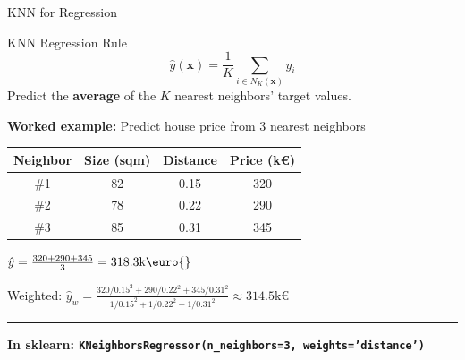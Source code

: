 \documentclass[8pt,aspectratio=169]{beamer}
\newcommand{\bottomnote}[1]{%
\vfill
\vspace{-2mm}
\textcolor{mllavender2}{\rule{\textwidth}{0.4pt}}
\vspace{1mm}
\footnotesize
\textbf{#1}
}
\newcommand{\highlight}[1]{\textcolor{mlorange}{\textbf{#1}}}
\begin{document}
\begin{frame}[t]{KNN for Regression}
\begin{block}{KNN Regression Rule}
\[
\hat{y}(\mathbf{x}) = \frac{1}{K}\sum_{i \in N_K(\mathbf{x})} y_i
\]
Predict the \highlight{average} of the $K$ nearest neighbors' target values.
\end{block}

\vspace{3mm}
\footnotesize
\textbf{Worked example:} Predict house price from 3 nearest neighbors

\vspace{1mm}
\begin{tabular}{cccc}
\toprule
\textbf{Neighbor} & \textbf{Size (sqm)} & \textbf{Distance} & \textbf{Price (k\euro{})} \\
\midrule
\#1 & 82 & 0.15 & 320 \\
\#2 & 78 & 0.22 & 290 \\
\#3 & 85 & 0.31 & 345 \\
\bottomrule
\end{tabular}

\vspace{2mm}
$\hat{y} = \frac{320 + 290 + 345}{3} = \text{318.3k\euro{}}$

\vspace{2mm}
Weighted: $\hat{y}_w = \frac{320/0.15^2 + 290/0.22^2 + 345/0.31^2}{1/0.15^2 + 1/0.22^2 + 1/0.31^2} \approx 314.5$k\euro{}
\bottomnote{In sklearn: \texttt{KNeighborsRegressor(n\_neighbors=3, weights='distance')}}
\end{frame}
\end{document}
